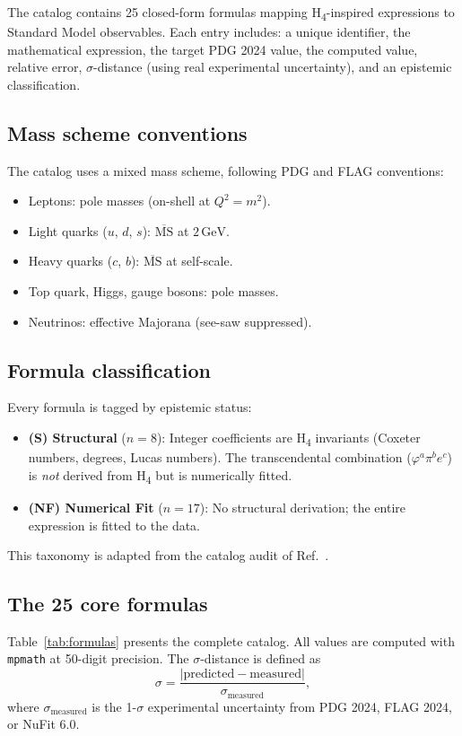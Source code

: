 \documentclass[11pt,a4paper]{article}
\newcommand{\GeV}{\,\text{GeV}}
\begin{document}
The catalog contains 25 closed-form formulas mapping H\textsubscript{4}-inspired
expressions to Standard Model observables.  Each entry includes: a unique
identifier, the mathematical expression, the target PDG 2024 value, the
computed value, relative error, $\sigma$-distance (using real experimental
uncertainty), and an epistemic classification.

\subsection{Mass scheme conventions}

The catalog uses a mixed mass scheme, following PDG and FLAG conventions:
\begin{itemize}
  \item Leptons: pole masses (on-shell at $Q^2=m^2$).
  \item Light quarks ($u$, $d$, $s$): $\overline{\text{MS}}$ at $2\GeV$.
  \item Heavy quarks ($c$, $b$): $\overline{\text{MS}}$ at self-scale.
  \item Top quark, Higgs, gauge bosons: pole masses.
  \item Neutrinos: effective Majorana (see-saw suppressed).
\end{itemize}

\subsection{Formula classification}

Every formula is tagged by epistemic status:
\begin{itemize}
  \item \textbf{(S) Structural} ($n=8$): Integer coefficients are
    H\textsubscript{4} invariants (Coxeter numbers, degrees, Lucas
    numbers).  The transcendental combination ($\varphi^a\pi^b e^c$) is
    \emph{not} derived from H\textsubscript{4} but is numerically fitted.
  \item \textbf{(NF) Numerical Fit} ($n=17$): No structural derivation;
    the entire expression is fitted to the data.
\end{itemize}
This taxonomy is adapted from the catalog audit of
Ref.~\cite{TrinityAudit}.

\subsection{The 25 core formulas}

Table~\ref{tab:formulas} presents the complete catalog.  All values are
computed with \texttt{mpmath} at 50-digit precision.  The
$\sigma$-distance is defined as
\begin{equation}
  \sigma = \frac{|\text{predicted} - \text{measured}|}{\sigma_{\text{measured}}},
\end{equation}
where $\sigma_{\text{measured}}$ is the 1-$\sigma$ experimental
uncertainty from PDG 2024, FLAG 2024, or NuFit 6.0.
\end{document}
